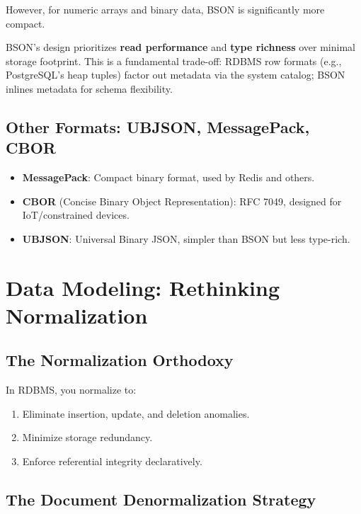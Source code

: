 \documentclass[12pt,a4paper]{article}
\begin{document}
However, for numeric arrays and binary data, BSON is significantly more compact.

\begin{keyinsight}
BSON's design prioritizes \textbf{read performance} and \textbf{type richness} over minimal storage footprint. This is a fundamental trade-off: RDBMS row formats (e.g., PostgreSQL's heap tuples) factor out metadata via the system catalog; BSON inlines metadata for schema flexibility.
\end{keyinsight}

\subsection{Other Formats: UBJSON, MessagePack, CBOR}

\begin{itemize}[noitemsep]
    \item \textbf{MessagePack}: Compact binary format, used by Redis and others.
    \item \textbf{CBOR} (Concise Binary Object Representation): RFC 7049, designed for IoT/constrained devices.
    \item \textbf{UBJSON}: Universal Binary JSON, simpler than BSON but less type-rich.
\end{itemize}

\section{Data Modeling: Rethinking Normalization}

\subsection{The Normalization Orthodoxy}

In RDBMS, you normalize to:
\begin{enumerate}[noitemsep]
    \item Eliminate insertion, update, and deletion anomalies.
    \item Minimize storage redundancy.
    \item Enforce referential integrity declaratively.
\end{enumerate}

\subsection{The Document Denormalization Strategy}
\end{document}
